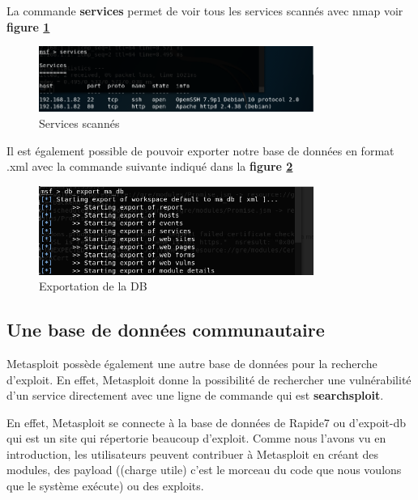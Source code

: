 La commande \textbf{services} permet de voir tous les services scannés avec nmap voir \textbf{figure \ref{fig:services-scan}}\\

\begin{figure}[h]
  \centering
  \setlength\figureheight{7cm}
  \setlength\figurewidth{9cm}
  \includegraphics[width=0.8\textwidth]{oui/Ancien/imangeancien/metasploit/db_services.PNG}
  \caption{Services scannés}
  \label{fig:services-scan}
\end{figure}

Il est également possible de pouvoir exporter notre base de données en format .xml avec la commande suivante indiqué dans la \textbf{figure \ref{fig:xml-db}}
\begin{figure}[h]
  \centering
  \setlength\figureheight{7cm}
  \setlength\figurewidth{9cm}
  \includegraphics[width=0.8\textwidth]{oui/Ancien/imangeancien/metasploit/db_export.PNG}
  \caption{Exportation de la DB}
  \label{fig:xml-db}
\end{figure}


\subsection{Une base de données communautaire}
Metasploit possède également une autre base de données pour la recherche d'exploit. En effet, Metasploit donne la possibilité de rechercher une vulnérabilité d'un service directement avec une ligne de commande qui est \textbf{searchsploit}.

En effet, Metasploit se connecte à la base de données de Rapide7 ou d'expoit-db qui est un site qui répertorie beaucoup d'exploit. Comme nous l'avons vu en introduction, les utilisateurs peuvent contribuer à Metasploit en créant des modules, des payload ((charge utile) c'est le morceau du code que nous voulons que le système exécute) ou des exploits. 

